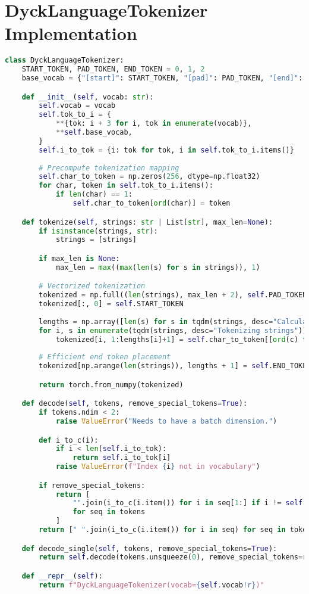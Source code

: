 \section{DyckLanguageTokenizer Implementation}\label{annex:tokenizer-impl}

\begin{lstlisting}[language=Python, caption=DyckLanguageTokenizer implementation, label=code:tokenizer_implementation]
class DyckLanguageTokenizer:
    START_TOKEN, PAD_TOKEN, END_TOKEN = 0, 1, 2
    base_vocab = {"[start]": START_TOKEN, "[pad]": PAD_TOKEN, "[end]": END_TOKEN}

    def __init__(self, vocab: str):
        self.vocab = vocab
        self.tok_to_i = {
            **{tok: i + 3 for i, tok in enumerate(vocab)},
            **self.base_vocab,
        }
        self.i_to_tok = {i: tok for tok, i in self.tok_to_i.items()}
        
        # Precompute tokenization mapping
        self.char_to_token = np.zeros(256, dtype=np.float32)
        for char, token in self.tok_to_i.items():
            if len(char) == 1:
                self.char_to_token[ord(char)] = token

    def tokenize(self, strings: str | List[str], max_len=None):
        if isinstance(strings, str):
            strings = [strings]

        if max_len is None:
            max_len = max((max(len(s) for s in strings)), 1)

        # Vectorized tokenization
        tokenized = np.full((len(strings), max_len + 2), self.PAD_TOKEN, dtype=np.float32)
        tokenized[:, 0] = self.START_TOKEN
        
        lengths = np.array([len(s) for s in tqdm(strings, desc="Calculating lengths")])
        for i, s in enumerate(tqdm(strings, desc="Tokenizing strings")):
            tokenized[i, 1:lengths[i]+1] = self.char_to_token[[ord(c) for c in s]]
        
        # Efficient end token placement
        tokenized[np.arange(len(strings)), lengths + 1] = self.END_TOKEN

        return torch.from_numpy(tokenized)

    def decode(self, tokens, remove_special_tokens=True):
        if tokens.ndim < 2:
            raise ValueError("Needs to have a batch dimension.")

        def i_to_c(i):
            if i < len(self.i_to_tok):
                return self.i_to_tok[i]
            raise ValueError(f"Index {i} not in vocabulary")

        if remove_special_tokens:
            return [
                "".join(i_to_c(i.item()) for i in seq[1:] if i != self.START_TOKEN and i != self.END_TOKEN)
                for seq in tokens
            ]
        return [" ".join(i_to_c(i.item()) for i in seq) for seq in tokens]

    def decode_single(self, tokens, remove_special_tokens=True):
        return self.decode(tokens.unsqueeze(0), remove_special_tokens=remove_special_tokens)[0]

    def __repr__(self):
        return f"DyckLanguageTokenizer(vocab={self.vocab!r})"
\end{lstlisting}
